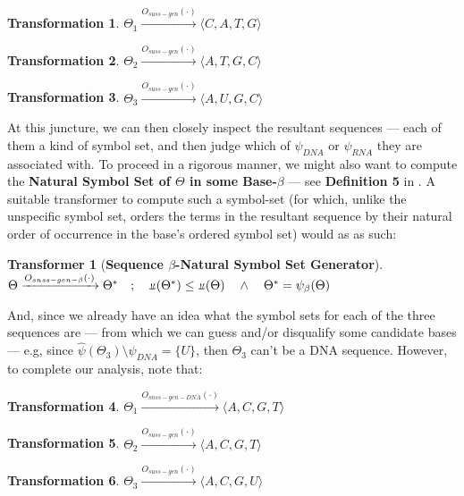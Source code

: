 \documentclass[a4paper, 18pt]{article} %
\newtheorem{trans}{Transformation}
\newtheorem{transf}{Transformer}
\newcommand{\invpi}{\rotatebox[origin=c]{180}{$\pi$}}
\begin{document}
\begin{trans}
$\Theta_1 \xrightarrow{O_{suss-gen}(\cdot)} \langle C, A, T, G \rangle$
\end{trans}

\begin{trans}
$\Theta_2 \xrightarrow{O_{suss-gen}(\cdot)} \langle A, T, G, C \rangle$
\end{trans}

\begin{trans}
$\Theta_3 \xrightarrow{O_{suss-gen}(\cdot)} \langle A, U, G, C \rangle$
\end{trans}

At this juncture, we can then closely inspect the resultant sequences --- each of them a kind of symbol set, and then judge which of $\psi_{DNA}$ or $\psi_{RNA}$ they are associated with. To proceed in a rigorous manner, we might also want to compute the \textbf{Natural Symbol Set of $\Theta$ in some Base-$\beta$} --- see \textbf{Definition 5} in \cite{ossipaper}. A suitable transformer to compute such a symbol-set (for which, unlike the unspecific symbol set, orders the terms in the resultant sequence by their natural order of occurrence in the base's ordered symbol set) would as as such:\\


\begin{transf}[\textbf{Sequence $\beta$-Natural Symbol Set Generator}]
\label{TRANSNSGEN}$ $\\
$\Theta \xrightarrow{O_{snss-gen-\beta}(\cdot)} \Theta^* \quad;\quad \invpi(\Theta^*) \leq \invpi(\Theta) \quad \land \quad \Theta^* = \psi_\beta(\Theta)$
\end{transf}

And, since we already have an idea what the symbol sets for each of the three sequences are --- from which we can guess and/or disqualify some candidate bases --- e.g, since $\hat{\psi}(\Theta_3) \setminus \psi_{DNA} = \{U\}$, then $\Theta_3$ can't be a DNA sequence. However, to complete our analysis, note that:


\begin{trans}
$\Theta_1 \xrightarrow{O_{snss-gen-DNA}(\cdot)} \langle A, C, G, T \rangle$
\end{trans}

\begin{trans}
$\Theta_2 \xrightarrow{O_{suss-gen}(\cdot)} \langle A, C, G, T \rangle$
\end{trans}

\begin{trans}
$\Theta_3 \xrightarrow{O_{suss-gen}(\cdot)} \langle A, C, G, U \rangle$
\end{trans}
\end{document}
